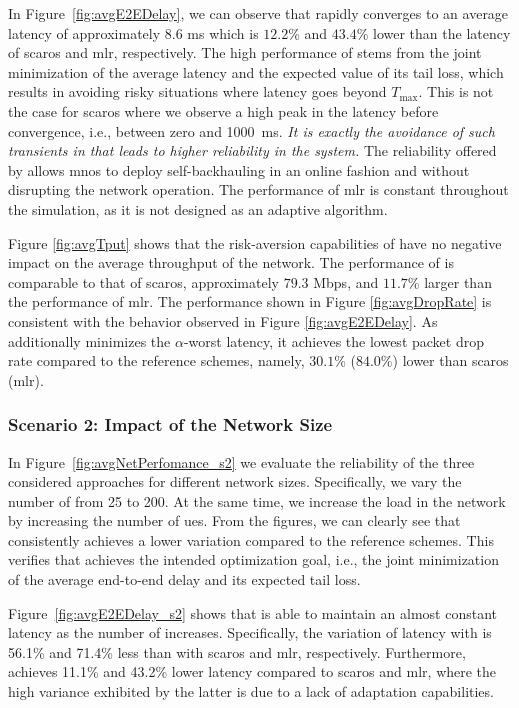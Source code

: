 In Figure~\ref{fig:avgE2EDelay}, we can observe that \name{} rapidly converges to an average latency of approximately $8.6$ ms which is $12.2$\% and $43.4$\% lower than the latency of \gls{scaros} and \gls{mlr}, respectively. The high performance of \name{} stems from the joint minimization of the average latency and the expected value of its tail loss, which results in avoiding risky situations where latency goes beyond $T_\mathrm{max}$.
This is not the case for \gls{scaros} where we observe a high peak in the latency before convergence, i.e., between zero and 1000~ms. \textit{It is exactly the avoidance of such transients in \name{} that leads to higher reliability in the system.} The reliability offered by \name{} allows \glspl{mno} to deploy self-backhauling in an online fashion and without disrupting the network operation. The performance of \gls{mlr} is constant throughout the simulation, as it is not designed as an adaptive algorithm.


Figure \ref{fig:avgTput} shows that the risk-aversion capabilities of \name{} have no negative impact on the average throughput of the network. 
The performance of \name{} is comparable to that of \gls{scaros}, approximately $79.3$ Mbps, and $11.7$\% larger than the performance of \gls{mlr}.
The performance shown in Figure \ref{fig:avgDropRate} is consistent with the behavior observed in Figure \ref{fig:avgE2EDelay}. As \name{} additionally minimizes the $\alpha$-worst latency, it achieves the lowest packet drop rate compared to the reference schemes, namely, $30.1$\% ($84.0$\%) lower than \gls{scaros} (\gls{mlr}).


\subsubsection*{Scenario 2: Impact of the Network Size}
\label{sub:netSize}
In Figure~\ref{fig:avgNetPerfomance_s2} we evaluate the reliability of the three considered approaches for different network sizes. Specifically, we vary the number of \nodes{} from 25 to 200.  At the same time, we increase the load in the network by increasing the number of \gls{ue}s.
From the figures, we can clearly see that \name{} consistently achieves a lower variation compared to the reference schemes. This verifies that \name{} achieves the intended optimization goal, i.e., the joint minimization of the average end-to-end delay and its expected tail loss.

Figure~\ref{fig:avgE2EDelay_s2} shows that \name{} is able to maintain an almost constant latency as the number of \nodes{} increases. Specifically, the variation of latency with \name{} is  56.1\% and 71.4\% less than with \gls{scaros} and \gls{mlr}, respectively. Furthermore, \name{} achieves 11.1\% and 43.2\% lower latency compared to \gls{scaros} and \gls{mlr}, where the high variance exhibited by the latter is due to a lack of adaptation capabilities. 


